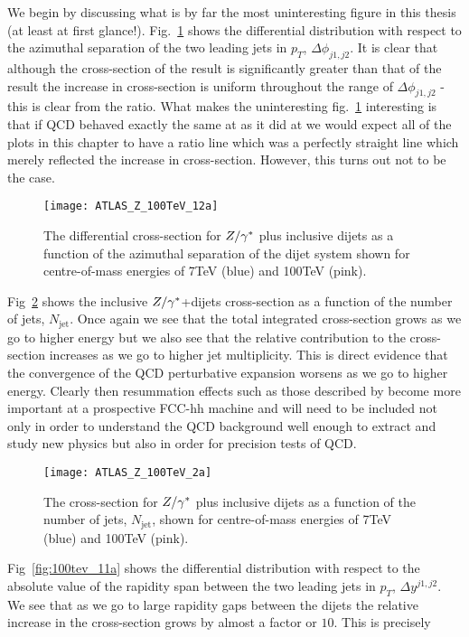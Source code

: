 	We begin by discussing what is by far the most uninteresting figure in this thesis (at least at first glance!).
	Fig.~\ref{fig:100tev_12a} shows the differential distribution with respect to the azimuthal separation of the
	two leading jets in $p_T$, $\Delta\phi_{j1, j2}$.  It is clear that although the cross-section of the \htev
	result is significantly greater than that of the \stev result the increase in cross-section is uniform
	throughout the range of $\Delta\phi_{j1, j2}$ - this is clear from the ratio.  What makes the
	uninteresting fig.~\ref{fig:100tev_12a} interesting is that if QCD behaved exactly the same at \htev
	as it did at \stev we would expect all of the plots in this chapter to have a ratio line which
	was a perfectly straight line which merely reflected the increase in cross-section.  However, this
	turns out not to be the case.

	\begin{figure}[bth]
		\centering
		\texttt{[image: ATLAS\_Z\_100TeV\_12a]}
		\caption{The differential cross-section for $Z/\gamma^*$ plus inclusive dijets as a
		function of the azimuthal separation of the dijet system shown for centre-of-mass
		energies of 7TeV (blue) and 100TeV (pink).}
		\label{fig:100tev_12a}
	\end{figure}

	Fig~\ref{fig:100tev_2a} shows the inclusive $Z/\gamma^*$+dijets cross-section as a function of the number
	of jets, $N_{\text{jet}}$.  Once again we see that the total integrated cross-section grows as we
	go to higher energy but we also see that the relative contribution to the cross-section increases
	as we go to higher jet multiplicity.  This is direct evidence that the convergence of the
	QCD perturbative expansion worsens as we go to higher energy.  Clearly then resummation effects
	such as those described by \hej become more important at a prospective FCC-hh machine and will need
	to be included not only in order to understand the QCD background well enough to extract and
	study new physics but also in order for precision tests of QCD.

	\begin{figure}[bth]
		\centering
		\texttt{[image: ATLAS\_Z\_100TeV\_2a]}
		\caption{The cross-section for $Z/\gamma^*$ plus inclusive dijets as a function of the number of
		jets, $N_{\text{jet}}$, shown for centre-of-mass energies of 7TeV (blue) and 100TeV (pink).}
		\label{fig:100tev_2a}
	\end{figure}

	Fig~\ref{fig:100tev_11a} shows the differential distribution with respect to the absolute value of the
	rapidity span between the two leading jets in $p_T$, $\Delta y^{j1, j2}$.  We see that as we go to
	large rapidity gaps between the dijets the relative increase in the cross-section grows by almost a
	factor or $10$.  This is precisely

